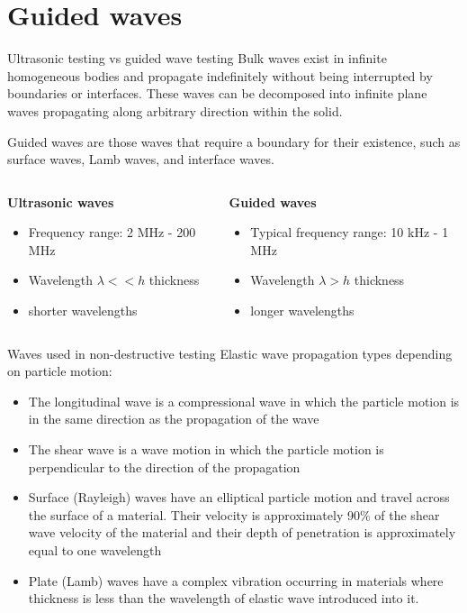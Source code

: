 \documentclass[10pt,aspectratio=169,dvipsnames]{beamer} %
\begin{document}
\section{Guided waves}
\begin{frame}{Ultrasonic testing vs guided wave testing}
	\alert{Bulk waves} exist in infinite homogeneous bodies and propagate indefinitely without being interrupted by boundaries or interfaces. 
	These waves can be decomposed into infinite plane waves propagating along arbitrary direction within the solid.
	
	\alert{Guided waves} are those waves that require a boundary for their existence, such as surface waves, Lamb waves, and interface waves.
	\vspace{5mm}
	\begin{columns}[T]
		\begin{column}{0.5\textwidth}
			\textbf{Ultrasonic waves}	
			\begin{itemize}
				\item Frequency range: 2 MHz - 200 MHz
				\item Wavelength \(\lambda << h\) thickness 
				\item shorter wavelengths
			\end{itemize}
		\end{column}
		\begin{column}{0.5\textwidth}
			\textbf{Guided waves}	
			\begin{itemize}
				\item Typical frequency range: 10 kHz - 1 MHz
				\item Wavelength \(\lambda > h\) thickness 
				\item longer wavelengths
			\end{itemize}
		\end{column}
	\end{columns}			
\end{frame}
\begin{frame}{Waves used in non-destructive testing}
	Elastic wave propagation types depending on particle motion:
	\begin{itemize}
		\item  \alert{The longitudinal wave} is a compressional wave in which the particle motion is in the same direction as the propagation of the wave
		\item \alert{The shear wave} is a wave motion in which the particle motion is perpendicular to the direction of the propagation
		\item \alert{Surface (Rayleigh) waves} have an elliptical particle motion and travel across the surface of a material. Their velocity is approximately 90\% of the shear wave velocity of the material and their depth of penetration is approximately equal to one
		wavelength
		\item \alert{Plate (Lamb) waves} have a complex vibration occurring in materials where thickness is less than the wavelength of elastic wave introduced into it.
	\end{itemize}
\end{frame}
\end{document}
